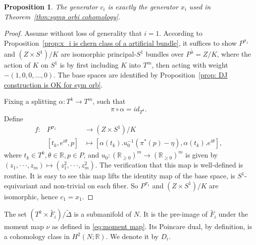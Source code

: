 \documentclass[12pt]{amsart}
\def\R {{\mathbb{R}}}
\def\cdots {{\cdot\cdot\cdot}}
\newtheorem{proposition}[theorem]{Proposition}
\theoremstyle{definition}
\numberwithin{equation}{section}
\begin{document}
\begin{proposition}\label{prop:chern class of torus bundle}
The generator $c_{i}$ is exactly the generator $x_{i}$ used in
Theorem~\ref{thm:symp orbi cohomology}.
\end{proposition}
\begin{proof}
Assume without loss of generality that $i=1$. According to
Proposition~\ref{prop:x_i is chern class of a artificial bundle}, it
suffices to show $P^{\sigma_{1}}$ and $(Z\times S^1)/K$ are
isomorphic principal-$S^1$ bundles over $P^{\tilde{\lambda}}=Z/K$,
where the action of $K$ on $S^1$ is by first including $K$ into
$T^m$, then acting with weight $-(1,0,0,...,0)$. The base spaces are
identified by Proposition~\ref{prop: DJ construction is OK for sym
orb}.

Fixing a splitting $\alpha : T^k\rightarrow T^m$, such that
\begin{equation}
\pi\circ\alpha=id_{T^k}.
\end{equation}
Define
\begin{eqnarray*}
f: & P^{\sigma_{1}} & \rightarrow (Z\times S^1)/K \\
   & [t_{k},e^{i\theta},p] & \mapsto [\alpha(t_{k}).u_{0}^{-1}(\pi^{*}(p)-\eta),
   \alpha(t_{k}).e^{i\theta}],
\end{eqnarray*}
where $t_{k}\in T^k, \theta\in \R, p\in P$, and $u_{0}: (\R_{\geq
0})^{m}\rightarrow (\R_{\geq 0})^{m}$ is given by
$(z_1,\cdots,z_m)\mapsto (z_1^2,\cdots, z_m^2)$.  The verification
that this map is well-defined is routine. It is easy to see this map
lifts the identity map of the base space, is $S^1$-equivariant and
non-trivial on each fiber. So $P^{\sigma_{1}}$ and $(Z\times S^1)/K$
are isomorphic, hence $c_{1}=x_{1}$.
\end{proof}

The set $(T^k\times\tilde{F_{i}})/\tilde{\Delta}$ is a submanifold
of $N$. It is the pre-image of $\tilde{F_{i}}$ under the moment map
$\nu$ as defined in \eqref{eq:moment map}. Its Poincare dual, by
definition, is a cohomology class in $H^{2}(N;\R)$. We denote it by
$D_{i}$.
\end{document}
